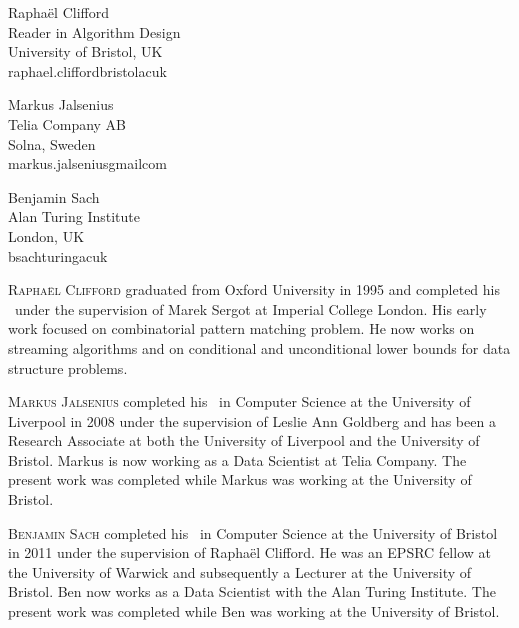 \documentclass{toc}
\begin{document}
%
%
%
%


%
%
%
%
\begin{tocauthors}
\begin{tocinfo}[clifford]
 Rapha\"el Clifford\\
 Reader in Algorithm Design\\
 University of Bristol, UK\\
 raphael.clifford\tocat{}bristol\tocdot{}ac\tocdot{}uk \\
\end{tocinfo}
\begin{tocinfo}[jalsenius]
  Markus Jalsenius\\
  Telia Company AB \\
  Solna, Sweden \\
  markus.jalsenius\tocat{}gmail\tocdot{}com \\
\end{tocinfo}
\begin{tocinfo}[sach]
	Benjamin Sach\\
	Alan Turing Institute\\
	London, UK\\
	bsach\tocat{}turing\tocdot{}ac\tocdot{}uk \\
\end{tocinfo}
\end{tocauthors}

%
%
%
%
%
%
%
%
%
%
%
%
%
%
\begin{tocaboutauthors}
\begin{tocabout}[clifford]
\textsc{Rapha\"el Clifford} graduated from Oxford University 
in 1995  and completed his \phd\ under the
%
supervision   %
of Marek Sergot at Imperial College London.
His early work focused on combinatorial pattern matching problem. He now
works on
%
streaming algorithms and
on       %
conditional and unconditional
lower bounds for data structure problems.
\end{tocabout}
\begin{tocabout}[jalsenius]

  \textsc{Markus Jalsenius} completed his \phd\ in Computer Science
%
at   %
the
University of Liverpool in 2008 under the supervision of Leslie Ann Goldberg
and has been a Research Associate at both the University of Liverpool and
the University of Bristol. Markus is now working as a Data Scientist at Telia
Company. The present work was completed while Markus was working at the
University of Bristol.

\end{tocabout}
\begin{tocabout}[sach]

\textsc{Benjamin Sach} completed his \phd\ in Computer Science at the University of Bristol in 2011 
under the supervision of Rapha\"el Clifford. He was an EPSRC fellow at the University of Warwick and
subsequently a Lecturer at the University of Bristol. Ben now works as a Data Scientist with the 
Alan Turing Institute. The present work was completed while Ben was working at the University of Bristol.


\end{tocabout}
\end{tocaboutauthors}
\end{document}
